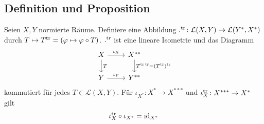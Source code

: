 \subsection[Definition und Proposition: Die transponierte Abbildung]{Definition und Proposition} %
\label{sub:34}
Seien $X,Y$ normierte Räume. Definiere eine Abbildung $.^{\mathrm{tr}} \colon \mathcal{L}(X,Y) \to \mathcal{L}(Y^*,X^*)$ durch $T \mapsto T^{\mathrm{tr}} = (\varphi \mapsto \varphi \circ T)$.
$.^{\mathrm{tr}}$ ist eine lineare Isometrie und das Diagramm
\[
	\begin{tikzcd}
		X \rar["\iota_X"] \dar["T"]& X^{**} \dar["T^{\tr \, \tr}= (T^\tr)^\tr"]\\
		Y \rar["\iota_Y"]& Y^{**}
	\end{tikzcd}
\]
kommutiert für jedes $T \in \mathcal{L}(X,Y)$. Für $\iota_{X^*} \colon X^* \to X^{***}$ und $\iota_{X}^{\mathrm{tr}} \colon X^{***} \to X^*$ gilt 
\[
	\iota_X^{\mathrm{tr}} \circ \iota_{X^*} = \operatorname{id}_{X^*}
\]
